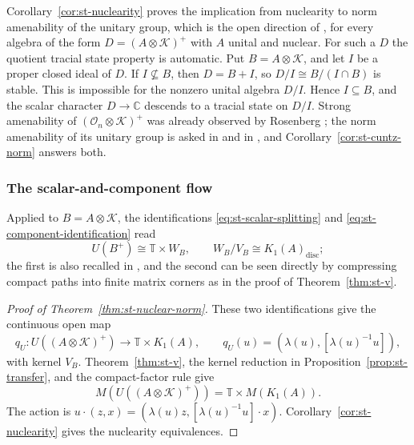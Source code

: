 \begin{remark}\label{rem:st-ast}
Corollary~\ref{cor:st-nuclearity} proves the implication from nuclearity to
norm amenability of the unitary group, which is the open direction of
\cite[Conjecture~1.1]{AlekseevSchmidtThom2025}, for every algebra of the form
\(D=(A\otimes\mathcal K)^+\) with \(A\) unital and nuclear. For such a \(D\) the
quotient tracial state property is automatic. Put \(B=A\otimes\mathcal K\),
and let \(I\) be a proper closed ideal of \(D\). If \(I\not\subseteq B\),
then \(D=B+I\), so \(D/I\cong B/(I\cap B)\) is stable. This is
impossible for the nonzero unital algebra \(D/I\). Hence \(I\subseteq B\),
and the scalar character \(D\to\mathbb C\) descends to a tracial state on
\(D/I\). Strong amenability of \((\mathcal O_n\otimes\mathcal K)^+\) was
already observed by Rosenberg \cite{Rosenberg1977}; the norm
amenability of its unitary group is asked in \cite[Section~4.1]{AlekseevSchmidtThom2025} and in
\cite[Question~9.3]{LupiniCuntz2026}, and
Corollary~\ref{cor:st-cuntz-norm} answers both.
\end{remark}


\subsubsection{The scalar-and-component flow}
\label{sec:st-unitary-flow}

Applied to \(B=A\otimes\mathcal K\), the identifications
\eqref{eq:st-scalar-splitting} and \eqref{eq:st-component-identification} read
\[
 U(B^+)\cong\mathbb T\times W_B,\qquad W_B/V_B\cong K_1(A)_{\mathrm{disc}};
\]
the first is also recalled in \cite[Section~5]{LupiniCuntz2026}, and the
second can be seen directly by compressing compact paths into finite
matrix corners as in the proof of Theorem~\ref{thm:st-v}.

\begin{proof}[Proof of Theorem~\ref{thm:st-nuclear-norm}]
These two identifications give the continuous open map
\[
 q_U:U((A\otimes\mathcal K)^+)\longrightarrow\mathbb T\times K_1(A),\qquad
 q_U(u)=(\lambda(u),[\lambda(u)^{-1}u]),
\]
with kernel \(V_B\). Theorem~\ref{thm:st-v}, the kernel reduction in
Proposition~\ref{prop:st-transfer}, and the compact-factor rule give
\[
 M(U((A\otimes\mathcal K)^+))=\mathbb T\times M(K_1(A)).
\]
The action is \(u\cdot(z,x)=(\lambda(u)z,[\lambda(u)^{-1}u]\cdot x)\).
Corollary~\ref{cor:st-nuclearity} gives the nuclearity equivalences.
\end{proof}

